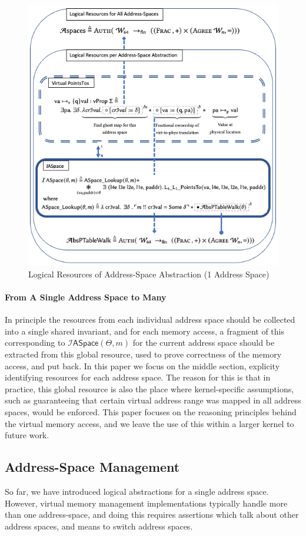 \documentclass[acmsmall,screen,nonacm]{acmart}
\begin{document}
\begin{figure}
   \includegraphics[width=0.75\columnwidth]{logical_addr_space.png}
  \caption{Logical Resources of Address-Space Abstraction (1 Address Space)}
  \label{fig:logicaladdrspace}
  \end{figure}

\paragraph{From A Single Address Space to Many}
In principle the resources from each individual address space should be collected into a single
shared invariant, and for each memory access,
a fragment of this corresponding to $\mathcal{I}\textsf{ASpace}(\Theta,m)$
for the current address space should be extracted from this global resource, used to prove correctness of the
memory access, and put back.
In this paper we focus on the middle section, explicity identifying resources for each
address space. The reason for this is that in practice, this global resource is also
the place where kernel-specific assumptions, such as guaranteeing that certain virtual address range
was mapped in all address spaces, would be enforced. This paper focuses on the
reasoning principles behind the virtual memory access, and we leave the use of this within a larger
kernel to future work.

\subsection{Address-Space Management}
\label{sec:aspacemanagement}
So far, we have introduced logical abstractions for a single address space. However, virtual memory management
implementations typically handle more than one address-space,
and doing this requires assertions which talk about other address spaces, and means to switch address spaces.
%
\end{document}

